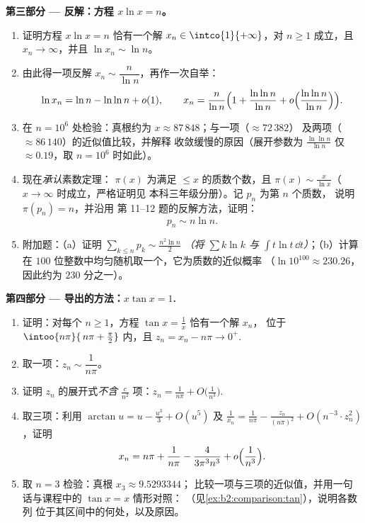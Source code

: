 \begin{problem}
\medskip
\noindent\textbf{第三部分 --- 反解：方程 $x\ln x =
n$。}
\begin{enumerate}[resume]
  \item 证明方程 $x\ln x = n$ 恰有一个解 $x_n \in
        \intco{1}{+\infty}$，对 $n \geq 1$ 成立，且 $x_n \to
        \infty$，并且 $\ln x_n \sim \ln n$。
  \item 由此得一项反解 $x_n \sim
        \dfrac{n}{\ln n}$，再作一次自举：
        \[
        \ln x_n = \ln n - \ln\ln n + o(1),
        \qquad
        x_n = \frac{n}{\ln n}\Bigl(1 + \frac{\ln\ln n}{\ln n}
        + o\Bigl(\frac{\ln\ln n}{\ln n}\Bigr)\Bigr).
        \]
  \item 在 $n = 10^6$ 处检验：真根约为 $x \approx
        87\,848$；与一项（$\approx 72\,382$）
        及两项（$\approx 86\,140$）的近似值比较，并解释
        收敛缓慢的原因（展开参数为 $\frac{\ln\ln
        n}{\ln n}$ 仅 $\approx 0.19$，取 $n = 10^6$ 时如此）。
  \item 现在\emph{承认}素数定理：
        $\pi(x)$ 为满足 $\leq x$ 的质数个数，且 $\pi(x) \sim
        \frac{x}{\ln x}$（$x \to \infty$ 时成立，严格证明见
        本科三年级分册）。记 $p_n$ 为第 $n$ 个质数，
        说明 $\pi(p_n) = n$，并沿用
        第 11--12 题的反解方法，证明：
        \[
        p_n \sim n \ln n .
        \]
  \item 附加题：（a）证明 $\sum_{k \leq n} p_k \sim
        \frac{n^2\ln n}{2}$ \emph{（将 $\sum k\ln k$ 与
        $\int t\ln t\,\dd t$）}；（b）计算
        在 $100$ 位整数中均匀随机取一个，它为质数的近似概率
        （$\ln 10^{100} \approx 230.26$，因此约为
        $230$ 分之一）。
\end{enumerate}

\medskip
\noindent\textbf{第四部分 --- 导出的方法：$x\tan x =
1$.}
\begin{enumerate}[resume]
  \item 证明：对每个 $n \geq 1$，方程 $\tan x =
        \frac1x$ 恰有一个解 $x_n$，
        位于 $\intoo{n\pi}{\,n\pi + \frac\pi2}$ 内，且 $z_n = x_n
        - n\pi \to 0^+$.
  \item 取一项：$z_n \sim \dfrac{1}{n\pi}$。
  \item 证明 $z_n$ 的展开式\emph{不含}
        $\frac{c}{n^2}$ 项：$z_n = \frac1{n\pi} +
        O\bigl(\frac{1}{n^3}\bigr)$.
  \item 取三项：利用 $\arctan u = u - \frac{u^3}3 +
        O(u^5)$ 及 $\frac1{x_n} = \frac{1}{n\pi} -
        \frac{z_n}{(n\pi)^2} + O(n^{-3}\cdot z_n^2)$，证明
        \[
        x_n = n\pi + \frac{1}{n\pi} -
        \frac{4}{3\pi^3 n^3} + o\Bigl(\frac{1}{n^3}\Bigr).
        \]
  \item 取 $n = 3$ 检验：真根 $x_3 \approx 9.5293344$；
        比较一项与三项的近似值，并用一句话与课程中的
        $\tan x = x$ 情形对照：
        （见\cref{ex:b2:comparison:tan}），说明各数列
        位于其区间中的何处，以及原因。
\end{enumerate}


\end{problem}
